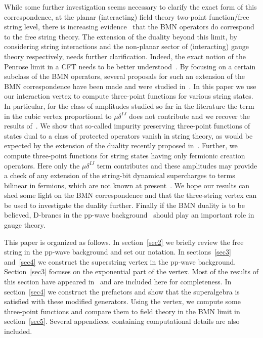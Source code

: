 \documentclass[12pt]{article}
\def\d{\delta}
\def\m{\mu}
\numberwithin{equation}{section} \setlength{\textwidth}{17cm}
\begin{document}
\noindent
While some further investigation seems necessary to clarify the exact form of this correspondence, at the
planar (interacting) field theory two-point function/free string level, there is increasing 
evidence~\cite{bmn,gross,sz} 
that the BMN operators do correspond to the free string theory. The extension of the duality
beyond this limit, by considering string interactions and the non-planar sector of (interacting) gauge theory 
respectively, 
needs further clarification. Indeed, the exact notion of the Penrose limit in a CFT needs to be better 
understood~\cite{AS}.
By focusing on a certain subclass of the BMN operators, several proposals for such an extension of the BMN
correspondence have been made and were studied in~\cite{jan,freedman,verlinde,zhou,jan2,freedman2,vv,janik,vsv,gomis}. 
In this paper we use our interaction vertex to compute
three-point functions for various string states. In particular, for the class of amplitudes studied so far in the 
literature the term in the cubic vertex proportional to $\m\d^{IJ}$ does not contribute 
and we recover the results of~\cite{sv2,vsv,gomis}. We show that so-called impurity preserving 
three-point functions of states dual to a class of protected operators vanish in string theory, as would be expected 
by the extension of the duality recently proposed in~\cite{vsv,gomis}. 
Further, we compute three-point functions for string states having only fermionic creation operators. Here 
only the $\m\d^{IJ}$ term contributes and these amplitudes may provide a check of any extension of the 
string-bit dynamical supercharges to terms bilinear in fermions, which are not known at present~\cite{vv}.
We hope our results can shed some light on the BMN correspondence and that the three-string vertex can be used to 
investigate the duality further.
Finally if the BMN duality is to be believed, D-branes in the pp-wave background~\cite{skenderis,bgg}
should play an important role in gauge theory.

\noindent This paper is organized as follows. In section~\ref{sec2} we briefly review
the free string in the pp-wave background and set our notation. In sections~\ref{sec3} and~\ref{sec4} we
construct the superstring vertex in the pp-wave background. Section~\ref{sec3} focuses on the exponential part of
the vertex. Most of the results of this section have appeared in~\cite{sv,sv2,ap} and are included
here for completeness.
In section~\ref{sec4} we construct the prefactors and show that the superalgebra is satisfied with these modified
generators. Using the vertex, we compute some three-point functions and compare them to field theory in the BMN limit
in section~\ref{sec5}. 
Several appendices, containing computational details are also included.
\end{document}
